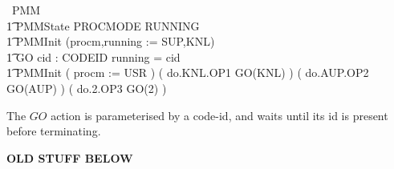 \begin{circus}
\circprocess\ PMM \circdef \circbegin \\
\t1 \circstate PMMState  PROCMODE \land RUNNING \\
\t1 PMMInit \circdef (procm,running := SUP,KNL) \\
\t1 GO \circdef
   \circval cid : CODEID \circspot
      \lcircguard running = cid \rcircguard \circguard \Skip \\
\t1 \circspot PMMInit \circseq
               ( procm := USR )
               \circseq ( do.KNL.OP1 \then GO(KNL) )
               \circseq ( do.AUP.OP2 \then GO(AUP) )
               \circseq ( do.2.OP3 \then GO(2) )\\
\circend
\end{circus}


The $GO$ action is parameterised by a code-id,
and waits until its id is present before terminating.


\newpage
\textbf{OLD STUFF BELOW}

